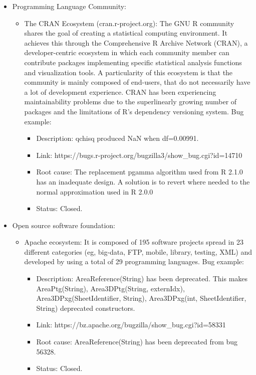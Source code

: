 \begin{itemize}
  \item Programming Language Community:
  \begin{itemize}
    \item The CRAN Ecosystem (cran.r-project.org): The GNU R community shares the
    goal of creating a statistical computing environment. It achieves this through
    the Comprehensive R Archive Network (CRAN), a developer-centric ecosystem in which each community member can contribute packages implementing specific statistical analysis functions and visualization tools. A particularity of this ecosystem is that the community is mainly composed of end-users, that do not necessarily have a lot of development experience. CRAN has been experiencing maintainability problems due to the superlinearly growing number of packages and the limitations of R’s dependency versioning system. Bug example:
    \begin{itemize}
      \item Description: qchisq produced NaN when df=0.00991.
      \item Link: https://bugs.r-project.org/bugzilla3/show\_bug.cgi?id=14710
      \item Root cause: The replacement
      pgamma algorithm used from R 2.1.0 has an inadequate design. A solution is
      to revert where needed to the normal approximation used in R 2.0.0
      \item Status: Closed.
    \end{itemize}
  \end{itemize}
  \item Open source software foundation:
  \begin{itemize}
    \item Apache ecosystem: It is composed of 195 software projects
    spread in 23 different categories (eg, big-data, FTP, mobile, library, testing, XML) and
    developed by using a total of 29 programming languages. Bug example:
    \begin{itemize}
      \item Description: AreaReference(String) has been deprecated. This makes
      AreaPtg(String), Area3DPtg(String, externIdx), Area3DPxg(SheetIdentifier,
      String), Area3DPxg(int, SheetIdentifier, String) deprecated constructors.
      \item Link: https://bz.apache.org/bugzilla/show\_bug.cgi?id=58331
      \item Root cause: AreaReference(String) has been deprecated from bug 56328.
      \item Status: Closed.

\end{itemize}
\end{itemize}
\end{itemize}
